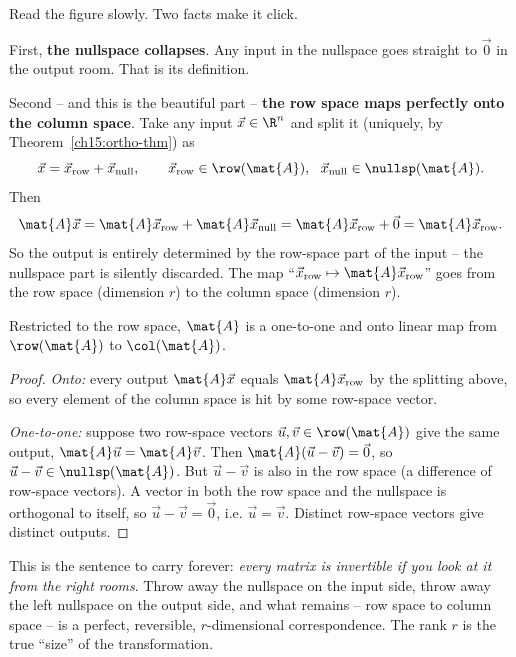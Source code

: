 Read the figure slowly. Two facts make it click.

First, \textbf{the nullspace collapses}. Any input in the nullspace goes straight to $\vec 0$ in
the output room. That is its definition.

Second -- and this is the beautiful part -- \textbf{the row space maps perfectly onto the column
space}. Take any input $\vec{x}\in\R^n$ and split it (uniquely, by
Theorem~\ref{ch15:ortho-thm}) as
\[
  \vec{x} = \vec{x}_{\text{row}} + \vec{x}_{\text{null}},
  \qquad \vec{x}_{\text{row}}\in\row(\mat{A}),\ \ \vec{x}_{\text{null}}\in\nullsp(\mat{A}).
\]
Then
\[
  \mat{A}\vec{x} = \mat{A}\vec{x}_{\text{row}} + \mat{A}\vec{x}_{\text{null}}
  = \mat{A}\vec{x}_{\text{row}} + \vec{0} = \mat{A}\vec{x}_{\text{row}}.
\]
So the output is entirely determined by the row-space part of the input -- the nullspace part is
silently discarded. The map ``$\vec{x}_{\text{row}}\mapsto\mat{A}\vec{x}_{\text{row}}$'' goes from
the row space (dimension $r$) to the column space (dimension $r$).

\begin{theorem}\label{ch15:iso-thm}
Restricted to the row space, $\mat{A}$ is a one-to-one and onto linear map from $\row(\mat{A})$ to
$\col(\mat{A})$.
\end{theorem}

\begin{proof}
\emph{Onto:} every output $\mat{A}\vec{x}$ equals $\mat{A}\vec{x}_{\text{row}}$ by the splitting
above, so every element of the column space is hit by some row-space vector.

\emph{One-to-one:} suppose two row-space vectors $\vec{u},\vec{v}\in\row(\mat{A})$ give the same
output, $\mat{A}\vec{u}=\mat{A}\vec{v}$. Then $\mat{A}(\vec{u}-\vec{v})=\vec{0}$, so
$\vec{u}-\vec{v}\in\nullsp(\mat{A})$. But $\vec{u}-\vec{v}$ is also in the row space (a difference
of row-space vectors). A vector in both the row space and the nullspace is orthogonal to itself,
so $\vec{u}-\vec{v}=\vec{0}$, i.e. $\vec{u}=\vec{v}$. Distinct row-space vectors give distinct
outputs.
\end{proof}

\begin{focusbox}
This is the sentence to carry forever: \emph{every matrix is invertible if you look at it from the
right rooms}. Throw away the nullspace on the input side, throw away the left nullspace on the
output side, and what remains -- row space to column space -- is a perfect, reversible,
$r$-dimensional correspondence. The rank $r$ is the true ``size'' of the transformation.
\end{focusbox}

